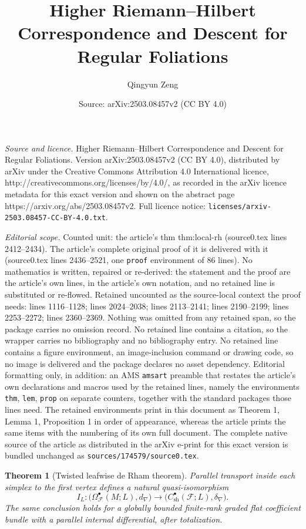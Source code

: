 \documentclass[10pt,a4paper]{amsart}
\title{Higher Riemann--Hilbert Correspondence and Descent for Regular Foliations}
\author{Qingyun Zeng}
\date{Source: arXiv:2503.08457v2 (CC BY 4.0)}
\newtheorem{thm}{Theorem}
\newcommand{\CF}{{\mathcal F}}
\begin{document}
\maketitle

\noindent\emph{Source and licence.} Higher Riemann--Hilbert Correspondence and Descent for Regular Foliations. Version arXiv:2503.08457v2 (CC BY 4.0), distributed by arXiv under the Creative Commons Attribution 4.0 International licence, http://creativecommons.org/licenses/by/4.0/, as recorded in the arXiv licence metadata for this exact version and shown on the abstract page https://arxiv.org/abs/2503.08457v2. Full licence notice: \texttt{licenses/arxiv-2503.08457-CC-BY-4.0.txt}.\par\smallskip

\noindent\textit{Editorial scope.} Counted unit: the article's thm thm:local-rh (source0.tex lines 2412--2434). The article's complete original proof of it is delivered with it (source0.tex lines 2436--2521, one \texttt{proof} environment of 86 lines). No mathematics is written, repaired or re-derived: the statement and the proof are the article's own lines, in the article's own notation, and no retained line is substituted or re-flowed.  Retained uncounted as the source-local context the proof needs: lines 1116--1128; lines 2024--2038; lines 2113--2141; lines 2190--2199; lines 2253--2272; lines 2360--2369.  Nothing was omitted from any retained span, so the package carries no omission record.  No retained line contains a citation, so the wrapper carries no bibliography and no bibliography entry.  No retained line contains a figure environment, an image-inclusion command or drawing code, so no image is delivered and the package declares no asset dependency.  Editorial formatting only, in addition: an AMS \texttt{amsart} preamble that restates the article's own declarations and macros used by the retained lines, namely the environments \texttt{thm}, \texttt{lem}, \texttt{prop} on separate counters, together with the standard packages those lines need.  The retained environments print in this document as Theorem 1, Lemma 1, Proposition 1 in order of appearance, whereas the article prints the same items with the numbering of its own full document.  The complete native source of the article as distributed in the arXiv e-print for this exact version is bundled unchanged as \texttt{sources/174579/source0.tex}.
\begin{thm}[Twisted leafwise de Rham theorem]\label{thm:twisted-dr}
Parallel transport inside each simplex to the first vertex defines a
natural quasi-isomorphism
\[
 I_L:
 \bigl(\Omega^\bullet_{\CF}(M;L),d_\nabla\bigr)
 \longrightarrow
 \bigl(C^\bullet_{\mathrm{sh}}(\CF;L),\delta_\nabla\bigr).
\]
The same conclusion holds for a globally bounded finite-rank graded
flat coefficient bundle with a parallel internal differential, after
totalization.
\end{thm}
\end{document}
